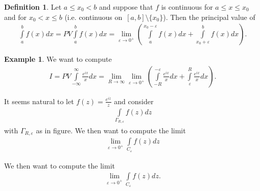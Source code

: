 \documentclass[12pt, a4paper]{article}
\theoremstyle{plain}
\theoremstyle{definition}
\newtheorem{definition}{Definition} %
\newtheorem{example}{Example} %
\begin{document}
			\begin{definition}
				Let $a\le x_0<b$ and suppose that $f$ is continuous for $a\le x\le x_0$ and for $x_0<x\le b$ (i.e. continuous on $[a,b]\setminus\{x_0\}$). Then the principal value of 
				\begin{align*}
					\int\limits_{a}^{b}f(x)dx =
					PV\int\limits_{a}^{b}f(x)dx =
					\lim\limits_{\varepsilon\to 0^+}\left(\int\limits_{a}^{x_0- \varepsilon}f(x)dx+\int\limits_{x_0+\varepsilon}^{b}f(x)dx\right).
				\end{align*}
			\end{definition}

			\begin{example}
				We want to compute
				\begin{align*}
					I=
					PV\int\limits_{-\infty}^{\infty}\frac{e^{ix}}{x}dx =
					\lim\limits_{R\to\infty}\lim\limits_{\varepsilon\to 0^+}
					\left(\int\limits_{-R}^{-\varepsilon}\frac{e^{ix}}{x}dx + 
					\int\limits_{\varepsilon}^{R}\frac{e^{ix}}{x}dx\right).
				\end{align*}
				\begin{multicols}{2}
					It seems natural to let $f(z)=\frac{e^{iz}}{z}$ and consider
					\begin{align*}
						\int\limits_{\Gamma_{R,\varepsilon}}f(z)dz
					\end{align*}
					with $\Gamma_{R,\varepsilon}$ as in figure. We then want to compute the limit
					\begin{align*}
						\lim\limits_{\varepsilon\to 0^+}\int\limits_{C_\varepsilon}f(z)dz
					\end{align*}
					\begin{figure}[H]
					\centering
					\end{figure}
				\end{multicols}
				We then want to compute the limit
				\begin{align*}
					\lim\limits_{\varepsilon\to 0^+}\int\limits_{C_\varepsilon}f(z)dz.
				\end{align*}
			\end{example}
\end{document}
